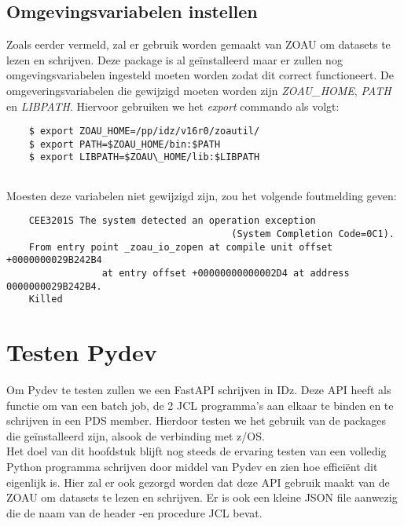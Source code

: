 \section{Omgevingsvariabelen instellen}
Zoals eerder vermeld, zal er gebruik worden gemaakt van ZOAU om datasets te lezen en schrijven. Deze package is al geïnstalleerd maar er zullen nog omgevingsvariabelen ingesteld moeten worden zodat dit correct functioneert. De omgeveringsvariabelen die gewijzigd moeten worden zijn \textit{ZOAU\_HOME}, \textit{PATH} en \textit{LIBPATH}. Hiervoor gebruiken we het \textit{export} commando als volgt: \\

\begin{lstlisting}
    $ export ZOAU_HOME=/pp/idz/v16r0/zoautil/
    $ export PATH=$ZOAU_HOME/bin:$PATH
    $ export LIBPATH=$ZOAU\_HOME/lib:$LIBPATH
    
\end{lstlisting}

Moesten deze variabelen niet gewijzigd zijn, zou het volgende foutmelding geven:
\begin{lstlisting}
    CEE3201S The system detected an operation exception 
                                        (System Completion Code=0C1).
    From entry point _zoau_io_zopen at compile unit offset +0000000029B242B4 
                 at entry offset +00000000000002D4 at address 0000000029B242B4.
    Killed
\end{lstlisting}

\chapter{Testen Pydev}
\label{ch:test-pydev}

Om Pydev te testen zullen we een FastAPI schrijven in IDz. Deze API heeft als functie om van een batch job, de 2 JCL programma's aan elkaar te binden en te schrijven in een PDS member. Hierdoor testen we het gebruik van de packages die geïnstalleerd zijn, alsook de verbinding met z/OS. \\

Het doel van dit hoofdstuk blijft nog steeds de ervaring testen van een volledig Python programma schrijven door middel van Pydev en zien hoe efficiënt dit eigenlijk is. Hier zal er ook gezorgd worden dat deze API gebruik maakt van de ZOAU om datasets te lezen en schrijven. Er is ook een kleine JSON file aanwezig die de naam van de header -en procedure JCL bevat. \\

